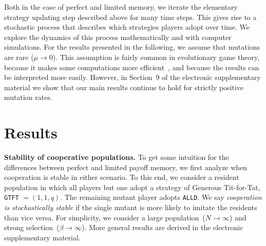 \documentclass[11pt]{article}
\def\alld{\texttt{ALLD}}
\def\gtft{\texttt{GTFT}}
\def\esm{electronic supplementary material}
\theoremstyle{plainCl1}
\theoremstyle{plainCl2}
\begin{document}

Both in the case of perfect and limited memory, we iterate the elementary strategy updating step described above for many time steps. 
This gives rise to a stochastic process that describes which strategies players adopt over time. 
We explore the dynamics of this process mathematically and with computer simulations.
For the results presented in the following, we assume that mutations are rare (\(\mu\!\rightarrow\! 0\)). 
This assumption is fairly common in evolutionary game theory, because it makes some computations more efficient~\citep{fudenberg:JET:2006,wu:JMB:2012,mcavoy:jet:2015}, and because the results can be interpreted more easily.  
However, in Section~9 of the \esm{} we show that our main results continue to hold for strictly positive mutation rates.




\section{Results}


\noindent
{\bf Stability of cooperative populations.}
To get some intuition for the differences between perfect and limited payoff memory, we first analyze when cooperation is stable in either scenario.
To this end, we consider a resident population in which all players but one adopt a strategy of Generous Tit-for-Tat, \gtft{} $=\!(1,1,q)$. 
The remaining mutant player adopts \alld. 
We say {\it cooperation is stochastically stable} if the single mutant is more likely to imitate the residents than vice versa. 
For simplicity, we consider a large population~($N\!\rightarrow\!\infty$) and strong selection~($\beta\!\rightarrow\!\infty$).
More general results are derived in the \esm. 

\end{document}
